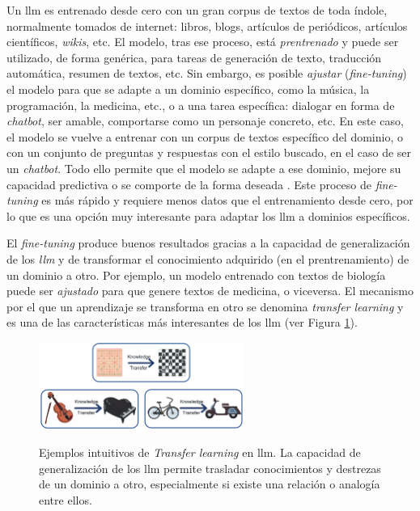 Un \gls{llm} es entrenado desde cero con un gran corpus de textos de toda índole, normalmente tomados de internet: libros, blogs, artículos de periódicos, artículos científicos, \textit{wikis}, etc. El modelo, tras ese proceso, está \textit{prentrenado} \citep{hanPreTrainedModelsPresent2021} y puede ser utilizado, de forma genérica, para tareas de generación de texto, traducción automática, resumen de textos, etc. Sin embargo, es posible \textit{ajustar} (\textit{fine-tuning}) el modelo para que se adapte a un dominio específico, como la música, la programación, la medicina, etc., o a una tarea específica: dialogar en forma de \textit{chatbot}, ser amable, comportarse como un personaje concreto, etc. En este caso, el modelo se vuelve a entrenar con un corpus de textos específico del dominio, o con un conjunto de preguntas y respuestas con el estilo buscado, en el caso de ser un \textit{chatbot}. Todo ello permite que el modelo se adapte a ese dominio, mejore su capacidad predictiva o se comporte de la forma deseada \citep{tianFinetuningLanguageModels2023}. Este proceso de \textit{fine-tuning} es más rápido y requiere menos datos que el entrenamiento desde cero, por lo que es una opción muy interesante para adaptar los \gls{llm} a dominios específicos.

El \textit{fine-tuning} produce buenos resultados gracias a la capacidad de generalización de los \textit{llm} y de transformar el conocimiento adquirido (en el prentrenamiento) de un dominio a otro. Por ejemplo, un modelo entrenado con textos de biología puede ser \textit{ajustado} para que genere textos de medicina, o viceversa. El mecanismo por el que un aprendizaje se transforma en otro se denomina \textit{transfer learning} \citep{zhuangComprehensiveSurveyTransfer2020} y es una de las características más interesantes de los \gls{llm} (ver Figura \ref{fig:transfer_learning}).

\begin{figure}[H]
    \caption[Ejemplos intuitivos de \emph{Transfer learning} en \gls{llm}]{Ejemplos intuitivos de \emph{Transfer learning} en \gls{llm}. La capacidad de generalización de los \gls{llm} permite trasladar conocimientos y destrezas de un dominio a otro, especialmente si existe una relación o analogía entre ellos.}
    \centering
    \includegraphics[width=0.6\textwidth]{./figuras/transfer_learning.png}
    \label{fig:transfer_learning}
\end{figure}


